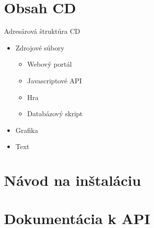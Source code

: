 \chapter{Obsah CD}
Adresárová štruktúra CD
\begin{itemize}
\item Zdrojové súbory
    \begin{itemize}
    \item Webový portál
    \item Javascriptové API
    \item Hra
    \item Databázový skript
    \end{itemize}
\item Grafika
\item Text
\end{itemize}

\chapter{Návod na inštaláciu}

\chapter{Dokumentácia k API}
